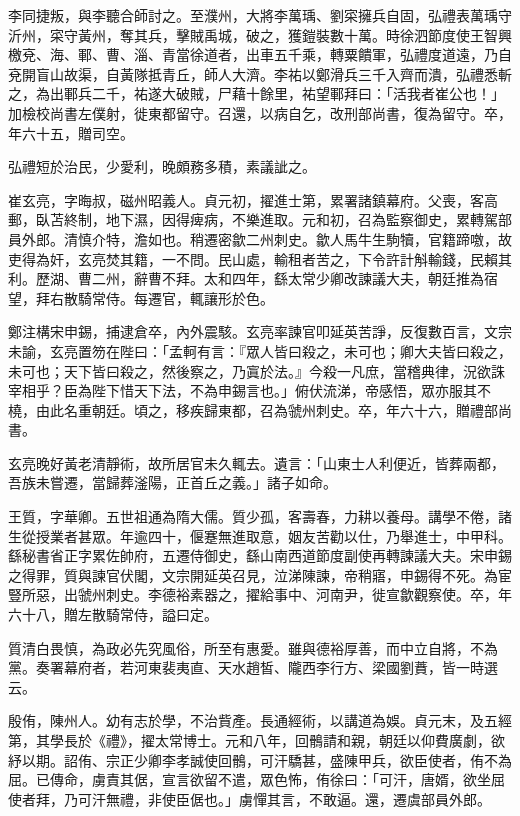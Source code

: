 \begin{pinyinscope}
 李同捷叛，與李聽合師討之。至濮州，大將李萬瑀、劉寀擁兵自固，弘禮表萬瑀守沂州，寀守黃州，奪其兵，擊賊禹城，破之，獲鎧裝數十萬。時徐泗節度使王智興檄兗、海、鄆、曹、淄、青當徐道者，出車五千乘，轉粟饋軍，弘禮度道遠，乃自兗開盲山故渠，自黃隊抵青丘，師人大濟。李祐以鄭滑兵三千入齊而潰，弘禮悉斬之，為出鄆兵二千，祐遂大破賊，尸藉十餘里，祐望鄆拜曰：「活我者崔公也！」加檢校尚書左僕射，徙東都留守。召還，以病自乞，改刑部尚書，復為留守。卒，年六十五，贈司空。



 弘禮短於治民，少愛利，晚頗務多積，素議訿之。



 崔玄亮，字晦叔，磁州昭義人。貞元初，擢進士第，累署諸鎮幕府。父喪，客高郵，臥苫終制，地下濕，因得痺病，不樂進取。元和初，召為監察御史，累轉駕部員外郎。清慎介特，澹如也。稍遷密歙二州刺史。歙人馬牛生駒犢，官籍蹄噭，故吏得為奸，玄亮焚其籍，一不問。民山處，輸租者苦之，下令許計斛輸錢，民賴其利。歷湖、曹二州，辭曹不拜。太和四年，繇太常少卿改諫議大夫，朝廷推為宿望，拜右散騎常侍。每遷官，輒讓形於色。



 鄭注構宋申錫，捕逮倉卒，內外震駭。玄亮率諫官叩延英苦諍，反復數百言，文宗未諭，玄亮置笏在陛曰：「孟軻有言：『眾人皆曰殺之，未可也；卿大夫皆曰殺之，未可也；天下皆曰殺之，然後察之，乃寘於法。』今殺一凡庶，當稽典律，況欲誅宰相乎？臣為陛下惜天下法，不為申錫言也。」俯伏流涕，帝感悟，眾亦服其不橈，由此名重朝廷。頃之，移疾歸東都，召為虢州刺史。卒，年六十六，贈禮部尚書。



 玄亮晚好黃老清靜術，故所居官未久輒去。遺言：「山東士人利便近，皆葬兩都，吾族未嘗遷，當歸葬滏陽，正首丘之義。」諸子如命。



 王質，字華卿。五世祖通為隋大儒。質少孤，客壽春，力耕以養母。講學不倦，諸生從授業者甚眾。年逾四十，偃蹇無進取意，姻友苦勸以仕，乃舉進士，中甲科。繇秘書省正字累佐帥府，五遷侍御史，繇山南西道節度副使再轉諫議大夫。宋申錫之得罪，質與諫官伏閣，文宗開延英召見，泣涕陳諫，帝稍寤，申錫得不死。為宦豎所惡，出虢州刺史。李德裕素器之，擢給事中、河南尹，徙宣歙觀察使。卒，年六十八，贈左散騎常侍，謚曰定。



 質清白畏慎，為政必先究風俗，所至有惠愛。雖與德裕厚善，而中立自將，不為黨。奏署幕府者，若河東裴夷直、天水趙皙、隴西李行方、梁國劉蕡，皆一時選云。



 殷侑，陳州人。幼有志於學，不治貲產。長通經術，以講道為娛。貞元末，及五經第，其學長於《禮》，擢太常博士。元和八年，回鶻請和親，朝廷以仰費廣劇，欲紓以期。詔侑、宗正少卿李孝誠使回鶻，可汗驕甚，盛陳甲兵，欲臣使者，侑不為屈。已傳命，虜責其倨，宣言欲留不遣，眾色怖，侑徐曰：「可汗，唐婿，欲坐屈使者拜，乃可汗無禮，非使臣倨也。」虜憚其言，不敢逼。還，遷虞部員外郎。




\end{pinyinscope}
